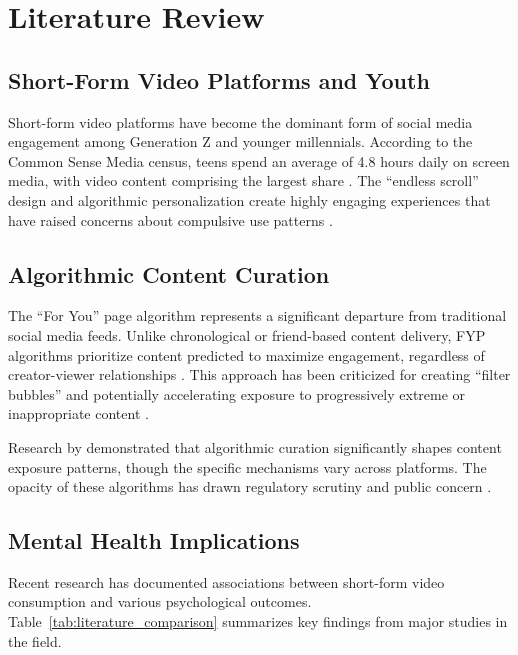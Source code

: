 \documentclass[12pt,a4paper]{article}
\begin{document}
\section{Literature Review}

\subsection{Short-Form Video Platforms and Youth}

Short-form video platforms have become the dominant form of social media engagement among Generation Z and younger millennials. According to the Common Sense Media census, teens spend an average of 4.8 hours daily on screen media, with video content comprising the largest share \citep{rideout2022common}. The ``endless scroll'' design and algorithmic personalization create highly engaging experiences that have raised concerns about compulsive use patterns \citep{alter2017irresistible}.

\subsection{Algorithmic Content Curation}

The ``For You'' page algorithm represents a significant departure from traditional social media feeds. Unlike chronological or friend-based content delivery, FYP algorithms prioritize content predicted to maximize engagement, regardless of creator-viewer relationships \citep{tiktok2023safety}. This approach has been criticized for creating ``filter bubbles'' and potentially accelerating exposure to progressively extreme or inappropriate content \citep{pariser2011filter, ribeiro2020auditing}.

Research by \citet{bakshy2015exposure} demonstrated that algorithmic curation significantly shapes content exposure patterns, though the specific mechanisms vary across platforms. The opacity of these algorithms has drawn regulatory scrutiny and public concern \citep{gorwa2020algorithmic}.

\subsection{Mental Health Implications}

Recent research has documented associations between short-form video consumption and various psychological outcomes. Table~\ref{tab:literature_comparison} summarizes key findings from major studies in the field.
\end{document}
